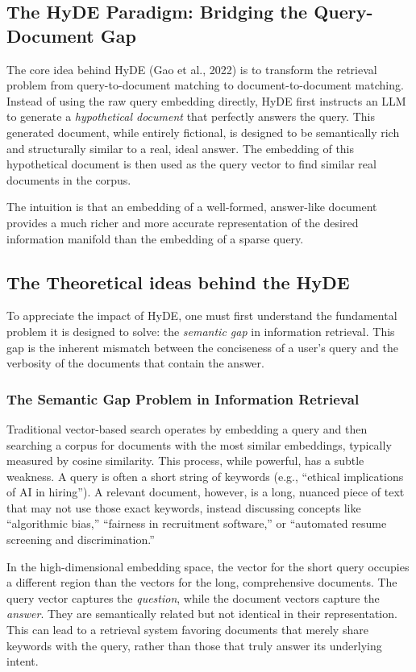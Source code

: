 \documentclass[12pt, a4paper]{article}
\begin{document}
\subsection{The HyDE Paradigm: Bridging the Query-Document Gap}
The core idea behind HyDE (Gao et al., 2022) is to transform the retrieval problem from query-to-document matching to document-to-document matching. Instead of using the raw query embedding directly, HyDE first instructs an LLM to generate a \textit{hypothetical document} that perfectly answers the query. This generated document, while entirely fictional, is designed to be semantically rich and structurally similar to a real, ideal answer. The embedding of this hypothetical document is then used as the query vector to find similar real documents in the corpus.

The intuition is that an embedding of a well-formed, answer-like document provides a much richer and more accurate representation of the desired information manifold than the embedding of a sparse query.

\subsection{The Theoretical ideas behind the HyDE}
To appreciate the impact of HyDE, one must first understand the fundamental problem it is designed to solve: the \textit{semantic gap} in information retrieval. This gap is the inherent mismatch between the conciseness of a user's query and the verbosity of the documents that contain the answer.

\subsubsection{The Semantic Gap Problem in Information Retrieval}
Traditional vector-based search operates by embedding a query and then searching a corpus for documents with the most similar embeddings, typically measured by cosine similarity. This process, while powerful, has a subtle weakness. A query is often a short string of keywords (e.g., ``ethical implications of AI in hiring''). A relevant document, however, is a long, nuanced piece of text that may not use those exact keywords, instead discussing concepts like ``algorithmic bias,'' ``fairness in recruitment software,'' or ``automated resume screening and discrimination.''

In the high-dimensional embedding space, the vector for the short query occupies a different region than the vectors for the long, comprehensive documents. The query vector captures the \textit{question}, while the document vectors capture the \textit{answer}. They are semantically related but not identical in their representation. This can lead to a retrieval system favoring documents that merely share keywords with the query, rather than those that truly answer its underlying intent.
\end{document}

